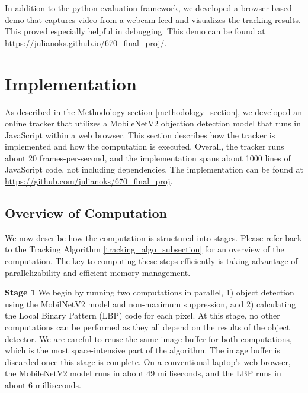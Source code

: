 \documentclass[10pt,twocolumn,letterpaper]{article}
\begin{document}
In addition to the python evaluation framework, we developed a browser-based demo that captures video from a webcam feed and visualizes the tracking results.
This proved especially helpful in debugging.
This demo can be found at \url{https://julianoks.github.io/670_final_proj/}.




\label{implementation_section}
\section{Implementation}
As described in the Methodology section \ref{methodology_section}, we developed an online tracker that utilizes a MobileNetV2 objection detection model that runs in JavaScript within a web browser.
This section describes how the tracker is implemented and how the computation is executed.
Overall, the tracker runs about 20 frames-per-second, and the implementation spans about 1000 lines of JavaScript code, not including dependencies.
The implementation can be found at \url{https://github.com/julianoks/670_final_proj}.

\label{overview_of_computation}
\subsection{Overview of Computation}
We now describe how the computation is structured into stages.
Please refer back to the Tracking Algorithm \ref{tracking_algo_subsection} for an overview of the computation.
The key to computing these steps efficiently is taking advantage of parallelizability and efficient memory management.

\textbf{Stage 1}
We begin by running two computations in parallel, 1) object detection using the MobilNetV2 model and non-maximum suppression, and 2) calculating the Local Binary Pattern (LBP) code for each pixel.
At this stage, no other computations can be performed as they all depend on the results of the object detector.
We are careful to reuse the same image buffer for both computations, which is the most space-intensive part of the algorithm. The image buffer is discarded once this stage is complete.
On a conventional laptop's web browser, the MobileNetV2 model runs in about 49 milliseconds, and the LBP runs in about 6 milliseconds. 
\end{document}
